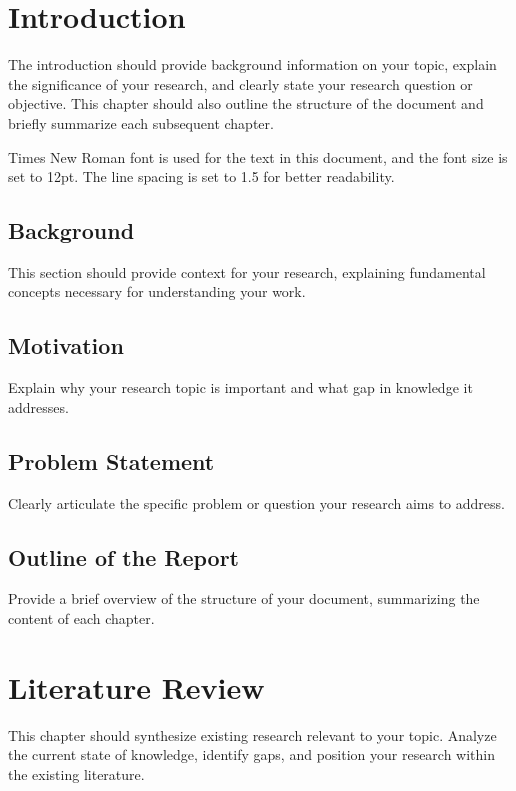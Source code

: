 \chapter{Introduction}
\label{chap:introduction}

The introduction should provide background information on your topic, explain the significance of your research, and clearly state your research question or objective. This chapter should also outline the structure of the document and briefly summarize each subsequent chapter. 

Times New Roman font is used for the text in this document, and the font size is set to 12pt. The line spacing is set to 1.5 for better readability.

\section{Background}
This section should provide context for your research, explaining fundamental concepts necessary for understanding your work. 

\section{Motivation}
Explain why your research topic is important and what gap in knowledge it addresses.

\section{Problem Statement}
Clearly articulate the specific problem or question your research aims to address.

\section{Outline of the Report}
Provide a brief overview of the structure of your document, summarizing the content of each chapter.

\chapter{Literature Review}
This chapter should synthesize existing research relevant to your topic. Analyze the current state of knowledge, identify gaps, and position your research within the existing literature.

